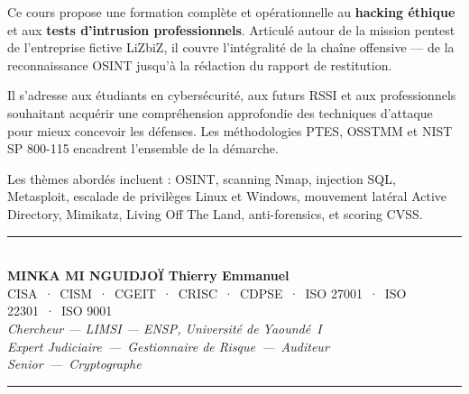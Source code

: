 \documentclass[12pt, a4paper, twoside, openright]{book}
\begin{document}
\begin{center}
\begin{minipage}{0.75\textwidth}
\color{white!85!gray}
Ce cours propose une formation complète et opérationnelle au \textbf{hacking éthique} et aux \textbf{tests d'intrusion professionnels}. Articulé autour de la mission pentest de l'entreprise fictive LiZbiZ, il couvre l'intégralité de la chaîne offensive — de la reconnaissance OSINT jusqu'à la rédaction du rapport de restitution.

\medskip

Il s'adresse aux étudiants en cybersécurité, aux futurs RSSI et aux professionnels souhaitant acquérir une compréhension approfondie des techniques d'attaque pour mieux concevoir les défenses. Les méthodologies PTES, OSSTMM et NIST SP 800-115 encadrent l'ensemble de la démarche.

\medskip

Les thèmes abordés incluent : OSINT, scanning Nmap, injection SQL, Metasploit, escalade de privilèges Linux et Windows, mouvement latéral Active Directory, Mimikatz, Living Off The Land, anti-forensics, et scoring CVSS.
\end{minipage}
\end{center}

\vfill

\begin{center}
    {\color{CouleurAccent}\rule{0.7\linewidth}{1.2pt}}\\[1.2ex]
    {\color{white}\large\bfseries MINKA MI NGUIDJOÏ Thierry Emmanuel}\\[0.4ex]
    {\color{white!80!gray}\small
        CISA~·~CISM~·~CGEIT~·~CRISC~·~CDPSE~·~ISO 27001~·~ISO 22301~·~ISO 9001}\\[0.3ex]
    {\color{white!70!gray}\footnotesize\itshape
        Chercheur — LIMSI — ENSP, Université de Yaoundé~I}\\[0.3ex]
    {\color{white!70!gray}\footnotesize\itshape
        Expert Judiciaire~—~Gestionnaire de Risque~—~Auditeur Senior~—~Cryptographe}\\[1.2ex]
    {\color{CouleurAccent}\rule{0.7\linewidth}{1.2pt}}
\end{center}
\vspace{1cm}

\afterpage{\nopagecolor}
\end{document}
